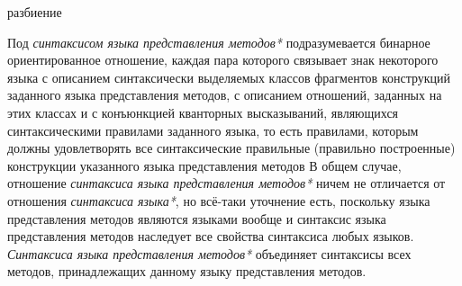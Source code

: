 \begin{SCn}
\begin{scnrelfromset}{разбиение}
    \begin{scnindent}
    \end{scnindent}
    \begin{scnindent}
    \end{scnindent}
    \begin{scnindent}
    \end{scnindent}
\end{scnrelfromset}
\end{SCn}

Под \textit{синтаксисом языка представления методов*} подразумевается бинарное ориентированное отношение, каждая пара которого связывает знак некоторого языка с описанием синтаксически выделяемых классов фрагментов конструкций заданного языка представления методов, с описанием отношений, заданных на этих классах и с конъюнкцией кванторных высказываний, являющихся синтаксическими правилами заданного языка, то есть правилами, которым должны удовлетворять все синтаксические правильные (правильно построенные) конструкции указанного языка представления методов В общем случае, отношение \textit{синтаксиса языка представления методов*} ничем не отличается от отношения \textit{синтаксиса языка*}, но всё-таки уточнение есть, поскольку языка представления методов являются языками вообще и синтаксис языка представления методов наследует все свойства синтаксиса любых языков. \textit{Синтаксиса языка представления методов*} объединяет синтаксисы всех методов, принадлежащих данному языку представления методов.

